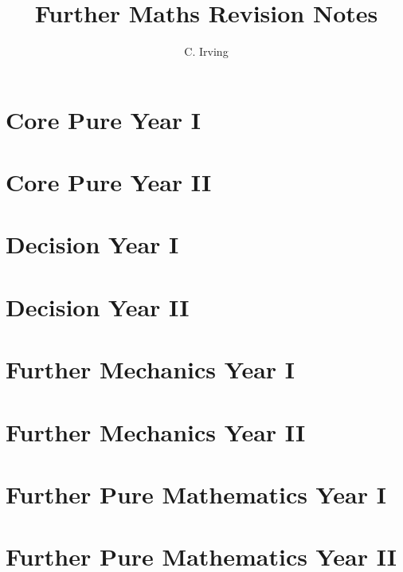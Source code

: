 \documentclass{book}
\title{\Huge Further Maths Revision Notes}
\author{C. Irving}
\date{}
\newcommand{\comment}[1]{} %
\theoremstyle{plain}
\theoremstyle{definition}
\begin{document}
\maketitle

\tableofcontents

\mainmatter

\chapter{Core Pure Year I} \label{ch:core_i}
    

\chapter{Core Pure Year II} \label{ch:core_ii}
    

\chapter{Decision Year I} \label{ch:decision_i}
    

\chapter{Decision Year II} \label{ch:decision_ii}
    

\chapter{Further Mechanics Year I} \label{ch:mechanics_i}
    

\chapter{Further Mechanics Year II} \label{ch:mechanics_ii}
    

\chapter{Further Pure Mathematics Year I} \label{ch:pure_i}
    

\chapter{Further Pure Mathematics Year II} \label{ch:pure_ii}
    
\end{document}
